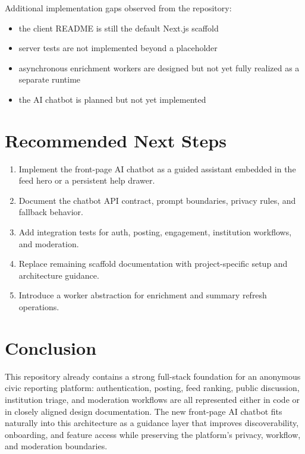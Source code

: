 \documentclass[11pt,a4paper]{article}
\begin{document}
Additional implementation gaps observed from the repository:
\begin{itemize}
  \item the client README is still the default Next.js scaffold
  \item server tests are not implemented beyond a placeholder
  \item asynchronous enrichment workers are designed but not yet fully realized as a separate runtime
  \item the AI chatbot is planned but not yet implemented
\end{itemize}

\section{Recommended Next Steps}
\begin{enumerate}
  \item Implement the front-page AI chatbot as a guided assistant embedded in the feed hero or a persistent help drawer.
  \item Document the chatbot API contract, prompt boundaries, privacy rules, and fallback behavior.
  \item Add integration tests for auth, posting, engagement, institution workflows, and moderation.
  \item Replace remaining scaffold documentation with project-specific setup and architecture guidance.
  \item Introduce a worker abstraction for enrichment and summary refresh operations.
\end{enumerate}

\section{Conclusion}
This repository already contains a strong full-stack foundation for an anonymous civic reporting platform: authentication, posting, feed ranking, public discussion, institution triage, and moderation workflows are all represented either in code or in closely aligned design documentation. The new front-page AI chatbot fits naturally into this architecture as a guidance layer that improves discoverability, onboarding, and feature access while preserving the platform's privacy, workflow, and moderation boundaries.
\end{document}
